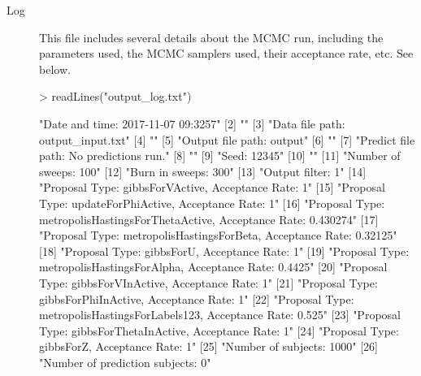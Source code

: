 \documentclass{article}
\begin{document}
\begin{description}
\item[Log] This file includes several details about the MCMC run, including the parameters used, the MCMC samplers used, their acceptance rate, etc. See below. 

\begin{Schunk}
\begin{Sinput}
> readLines("output_log.txt")
\end{Sinput}
\begin{Soutput}
 [1] "Date and time: 2017-11-07 09:3257"                                         
 [2] ""                                                                          
 [3] "Data file path: output_input.txt"                                          
 [4] ""                                                                          
 [5] "Output file path: output"                                                  
 [6] ""                                                                          
 [7] "Predict file path: No predictions run."                                    
 [8] ""                                                                          
 [9] "Seed: 12345"                                                               
[10] ""                                                                          
[11] "Number of sweeps: 100"                                                     
[12] "Burn in sweeps: 300"                                                       
[13] "Output filter: 1"                                                          
[14] "Proposal Type: gibbsForVActive, Acceptance Rate: 1"                        
[15] "Proposal Type: updateForPhiActive, Acceptance Rate: 1"                     
[16] "Proposal Type: metropolisHastingsForThetaActive, Acceptance Rate: 0.430274"
[17] "Proposal Type: metropolisHastingsForBeta, Acceptance Rate: 0.32125"        
[18] "Proposal Type: gibbsForU, Acceptance Rate: 1"                              
[19] "Proposal Type: metropolisHastingsForAlpha, Acceptance Rate: 0.4425"        
[20] "Proposal Type: gibbsForVInActive, Acceptance Rate: 1"                      
[21] "Proposal Type: gibbsForPhiInActive, Acceptance Rate: 1"                    
[22] "Proposal Type: metropolisHastingsForLabels123, Acceptance Rate: 0.525"     
[23] "Proposal Type: gibbsForThetaInActive, Acceptance Rate: 1"                  
[24] "Proposal Type: gibbsForZ, Acceptance Rate: 1"                              
[25] "Number of subjects: 1000"                                                  
[26] "Number of prediction subjects: 0"                                          

\end{Soutput}
\end{Schunk}
\end{description}
\end{document}
